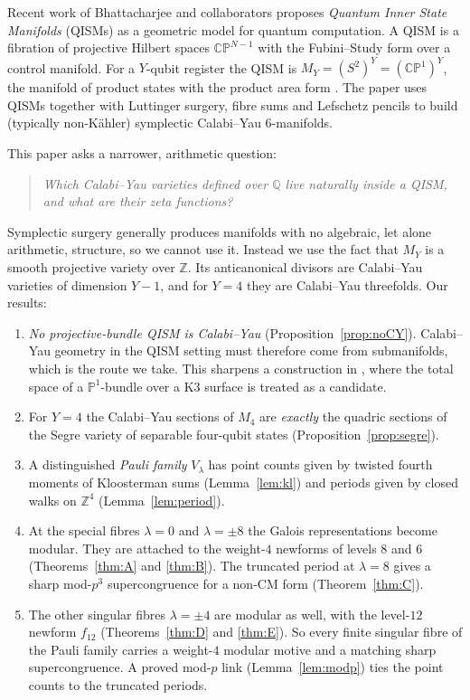 \documentclass[11pt]{amsart}
\theoremstyle{definition}
\newcommand{\Q}{\mathbb{Q}}
\newcommand{\Z}{\mathbb{Z}}
\newcommand{\PP}{\mathbb{P}}
\begin{document}
Recent work of Bhattacharjee and collaborators \cite{BN25,B26HQC,QuanTY1,QuanTY4} proposes \emph{Quantum Inner State Manifolds} (QISMs) as a geometric model for quantum computation. A QISM is a fibration of projective Hilbert spaces $\mathbb{CP}^{N-1}$ with the Fubini--Study form over a control manifold. For a $Y$-qubit register the QISM is $M_Y=(S^2)^Y=(\mathbb{CP}^1)^Y$, the manifold of product states with the product area form \cite[\S3]{QuanTY1}. The paper \cite{BN25} uses QISMs together with Luttinger surgery, fibre sums and Lefschetz pencils to build (typically non-K\"ahler) symplectic Calabi--Yau $6$-manifolds.

This paper asks a narrower, arithmetic question:

\begin{quote}
\emph{Which Calabi--Yau varieties defined over $\Q$ live naturally inside a QISM, and what are their zeta functions?}
\end{quote}

Symplectic surgery generally produces manifolds with no algebraic, let alone arithmetic, structure, so we cannot use it. Instead we use the fact that $M_Y$ is a smooth projective variety over $\Z$. Its anticanonical divisors are Calabi--Yau varieties of dimension $Y-1$, and for $Y=4$ they are Calabi--Yau threefolds. Our results:

\begin{enumerate}
\item \emph{No projective-bundle QISM is Calabi--Yau} (Proposition~\ref{prop:noCY}). Calabi--Yau geometry in the QISM setting must therefore come from submanifolds, which is the route we take. This sharpens a construction in \cite[\S4]{BN25}, where the total space of a $\PP^1$-bundle over a K3 surface is treated as a candidate.
\item For $Y=4$ the Calabi--Yau sections of $M_4$ are \emph{exactly} the quadric sections of the Segre variety of separable four-qubit states (Proposition~\ref{prop:segre}).
\item A distinguished \emph{Pauli family} $V_\lambda$ has point counts given by twisted fourth moments of Kloosterman sums (Lemma~\ref{lem:kl}) and periods given by closed walks on $\Z^4$ (Lemma~\ref{lem:period}).
\item At the special fibres $\lambda=0$ and $\lambda=\pm8$ the Galois representations become modular. They are attached to the weight-$4$ newforms of levels $8$ and $6$ (Theorems~\ref{thm:A} and \ref{thm:B}). The truncated period at $\lambda=8$ gives a sharp mod-$p^3$ supercongruence for a non-CM form (Theorem~\ref{thm:C}).
\item The other singular fibres $\lambda=\pm4$ are modular as well, with the level-$12$ newform $f_{12}$ (Theorems~\ref{thm:D} and \ref{thm:E}). So every finite singular fibre of the Pauli family carries a weight-$4$ modular motive and a matching sharp supercongruence. A proved mod-$p$ link (Lemma~\ref{lem:modp}) ties the point counts to the truncated periods.
\end{enumerate}
\end{document}

